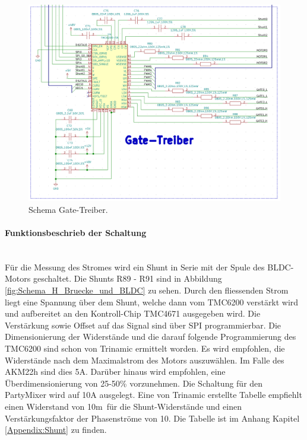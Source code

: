 \begin{figure}[H]
	\centering
	\includegraphics[width=\textwidth]{graphics/Schema_Gate_Treiber}
	\caption{Schema Gate-Treiber.}
	\label{fig:Schema_Gate_Treiber}
\end{figure}


\paragraph{Funktionsbeschrieb der Schaltung}\mbox{}\\

Für die Messung des Stromes wird ein Shunt in Serie mit der Spule des BLDC-Motors geschaltet. Die Shunts R89 - R91 sind in Abbildung \ref{fig:Schema_H_Bruecke_und_BLDC} zu sehen. Durch den fliessenden Strom liegt eine Spannung über dem Shunt, welche dann vom TMC6200 verstärkt wird und aufbereitet an den Kontroll-Chip TMC4671 ausgegeben wird. Die Verstärkung sowie Offset auf das Signal sind über SPI programmierbar.
Die Dimensionierung der Widerstände und die darauf folgende Programmierung des TMC6200 sind schon von Trinamic ermittelt worden. Es wird empfohlen, die Widerstände nach dem Maximalstrom des Motors auszuwählen. Im Falle des AKM22h sind dies 5A. Darüber hinaus wird empfohlen, eine Überdimensionierung von 25-50\% vorzunehmen. Die Schaltung für den PartyMixer wird auf 10A ausgelegt. Eine von Trinamic erstellte Tabelle  empfiehlt einen Widerstand von 10m\textOmega\ für die Shunt-Widerstände und einen Verstärkungsfaktor der Phasenströme von 10. Die Tabelle ist im Anhang Kapitel \ref{Appendix:Shunt} zu finden. \cite[S.31]{trinamicmotion_control_gmbh__co_kg_tmc6200_2019}

